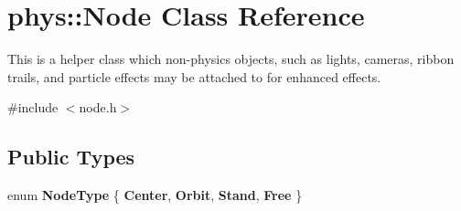 \hypertarget{classphys_1_1Node}{
\section{phys::Node Class Reference}
\label{d0/ddc/classphys_1_1Node}
}


This is a helper class which non-\/physics objects, such as lights, cameras, ribbon trails, and particle effects may be attached to for enhanced effects.  




{\ttfamily \#include $<$node.h$>$}

\subsection*{Public Types}
\begin{DoxyCompactItemize}
\item 
enum {\bfseries NodeType} \{ {\bfseries Center}, 
{\bfseries Orbit}, 
{\bfseries Stand}, 
{\bfseries Free}
 \}
\end{DoxyCompactItemize}
